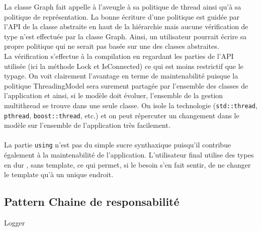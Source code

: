 La classe Graph fait appelle à l'aveugle à sa politique de thread ainsi qu'à sa politique de représentation. La bonne écriture d'une politique est guidée par l'API de la classe abstraite en haut de la hiérarchie mais aucune vérification de type n'est effectuée par la classe Graph. Ainsi, un utilisateur pourrait écrire sa propre politique qui ne serait pas basée sur une des classes abstraites.\\
La vérification s'effectue à la compilation en regardant les parties de l'API utilisée (ici la méthode Lock et IsConnected) ce qui est moins restrictif que le typage. On voit clairement l'avantage en terme de maintenabilité puisque la politique ThreadingModel sera surement partagée par l'ensemble des classes de l'application et ainsi, si le modèle doit évoluer, l'ensemble de la gestion multithread se trouve dans une seule classe. On isole la technologie (\verb|std::thread|, \verb|pthread|, \verb|boost::thread|, etc.) et on peut répercuter un changement dans le modèle sur l'ensemble de l'application très facilement.\\\\
La partie \verb|using| n'est pas du simple sucre synthaxique puisqu'il contribue également à la maintenabilité de l'application. L'utilisateur final utilise des types en \og{} dur \fg, sans template, ce qui permet, si le besoin s'en fait sentir, de ne changer le template qu'à un unique endroit.

\subsection{Pattern Chaine de responsabilité}
Logger
